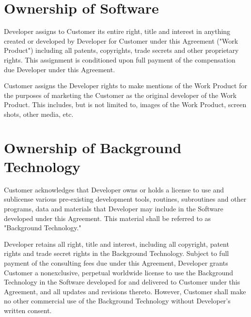 \documentclass[11pt]{article}
\begin{document}
\section{Ownership of Software}
Developer assigns to Customer its entire right, title and interest in anything created or developed by Developer for Customer under this Agreement ("Work Product") including all patents, copyrights, trade secrets and other proprietary rights. This assignment is conditioned upon full payment of the compensation due Developer under this Agreement. 

Customer assigns the Developer rights to make mentions of the Work Product for the purposes of marketing the Customer as the original developer of the Work Product. This includes, but is not limited to, images of the Work Product, screen shots, other media, etc.
\section{Ownership of Background Technology}
Customer acknowledges that Developer owns or holds a license to use and sublicense various pre-existing development tools, routines, subroutines and other programs, data and materials that Developer may include in the Software developed under this Agreement. This material shall be referred to as "Background Technology."  

Developer retains all right, title and interest, including all copyright, patent rights and trade secret rights in the Background Technology. Subject to full payment of the consulting fees due under this Agreement, Developer grants Customer a nonexclusive, perpetual worldwide license to use the Background Technology in the Software developed for and delivered to Customer under this Agreement, and all updates and revisions thereto. However, Customer shall make no other commercial use of the Background Technology without Developer’s written consent.
\end{document}
